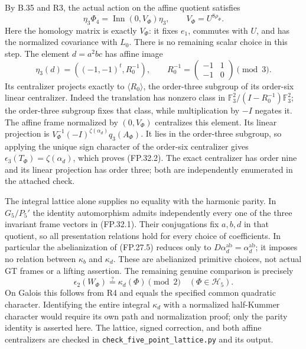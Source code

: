 By B.35 and R3, the actual action on the affine quotient satisfies
\[
 \eta_3\Phi_4=\operatorname{Inn}(0,V_\Phi)\eta_3,
 \qquad V_\Phi=U^{8\rho_\Phi}.
\]
Here the homology matrix is exactly $V_\Phi$: it fixes $e_1$,
commutes with $U$, and has the normalized covariance with $L_0$.
There is no remaining scalar choice in this step.
The element $d=a^2bc$ has affine image
\[
 \eta_3(d)=\left((-1,-1)^t,R_0^{-1}\right),\qquad
 R_0^{-1}=\begin{pmatrix}-1&1\\-1&0\end{pmatrix}\pmod3.
\]
Its centralizer projects exactly to $\langle R_0\rangle$, the
order-three subgroup of its order-six linear centralizer. Indeed
the translation has nonzero class in
$\mathbb F_3^2/(I-R_0^{-1})\mathbb F_3^2$; the order-three subgroup
fixes that class, while multiplication by $-I$ negates it.
The affine frame normalized by $(0,V_\Phi)$ centralizes this element.
Its linear projection is
$V_\Phi^{-1}(-I)^{\zeta(\alpha_d)}q_3(A_\Phi)$.
It lies in the order-three subgroup, so applying the unique sign
character of the order-six centralizer gives
$\epsilon_3(T_\Phi)=\zeta(\alpha_d)$, which proves (FP.32.2).
The exact centralizer has order nine and its linear projection has
order three; both are independently enumerated in the attached check.

The integral lattice alone supplies no equality with the harmonic
parity. In $G_5/P_5'$ the identity automorphism admits independently
every one of the three invariant frame vectors in (FP.32.1). Their
conjugations fix $a,b,d$ in that quotient, so all presentation relations
hold for every choice of coefficients. In particular the abelianization
of (FP.27.5) reduces only to $D\alpha_d^{\mathrm{ab}}
=\alpha_d^{\mathrm{ab}}$; it imposes no relation between
$\kappa_b$ and $\kappa_d$. These are abelianized primitive choices,
not actual GT frames or a lifting assertion. The remaining genuine
comparison is precisely
\[
 \epsilon_2(W_\Phi)\stackrel{?}{=}\kappa_d(\Phi)\pmod2
 \quad(\Phi\in\mathcal H_5).
\]
On Galois this follows from R4 and equals the specified common
quadratic character. Identifying the entire integral $\kappa_d$ with
a normalized half-Kummer character would require its own path and
normalization proof; only the parity identity is asserted here.
The lattice, signed correction, and both affine centralizers are
checked in \texttt{check\_five\_point\_lattice.py} and its output.

